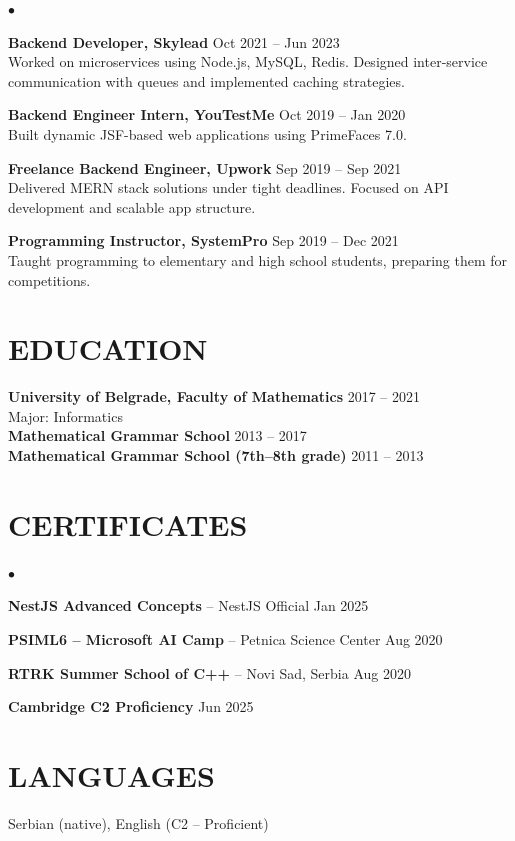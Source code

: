 \documentclass[margin,center]{res}
\newenvironment{list1}{
  \begin{list}{$\bullet$}{
      \setlength{\itemsep}{0in}
      \setlength{\parsep}{0in}
      \setlength{\parskip}{0in}
      \setlength{\topsep}{0in}
      \setlength{\partopsep}{0in}
      \setlength{\leftmargin}{0.17in}}}{\end{list}}
\begin{document}
\begin{resume}
\begin{list1}
\item \textbf{Backend Developer, Skylead} \hfill Oct 2021 -- Jun 2023 \\
Worked on microservices using Node.js, MySQL, Redis. Designed inter-service communication with queues and implemented caching strategies.

\item \textbf{Backend Engineer Intern, YouTestMe} \hfill Oct 2019 -- Jan 2020 \\
Built dynamic JSF-based web applications using PrimeFaces 7.0.

\item \textbf{Freelance Backend Engineer, Upwork} \hfill Sep 2019 -- Sep 2021 \\
Delivered MERN stack solutions under tight deadlines. Focused on API development and scalable app structure.

\item \textbf{Programming Instructor, SystemPro} \hfill Sep 2019 -- Dec 2021 \\
Taught programming to elementary and high school students, preparing them for competitions.
\end{list1}

\section{EDUCATION}
\textbf{University of Belgrade, Faculty of Mathematics} \hfill 2017 -- 2021 \\
Major: Informatics \\
\textbf{Mathematical Grammar School} \hfill 2013 -- 2017 \\
\textbf{Mathematical Grammar School (7th–8th grade)} \hfill 2011 -- 2013

\section{CERTIFICATES}
\begin{list1}
\item \textbf{NestJS Advanced Concepts} – NestJS Official \hfill Jan 2025
\item \textbf{PSIML6 – Microsoft AI Camp} – Petnica Science Center \hfill Aug 2020
\item \textbf{RTRK Summer School of C++} – Novi Sad, Serbia \hfill Aug 2020
\item \textbf{Cambridge C2 Proficiency} \hfill Jun 2025
\end{list1}

\section{LANGUAGES}
Serbian (native), English (C2 – Proficient)

\end{resume}
\end{document}
